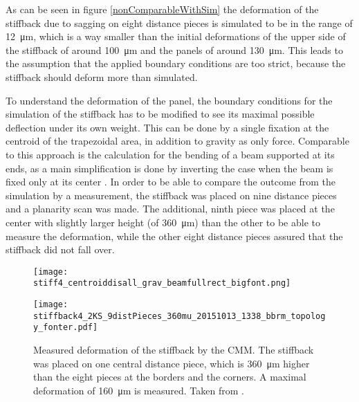 \documentclass[
a4paper,                                %
twoside,                                %
BCOR1.4cm,                      %
10pt,                           %
headings=normal,                %
headsepline,                    %
clearplainpage, %
final,                                  %
div=14,
parskip=full,
openright,
bibliography=toc
]{scrreprt}
\begin{document}
As can be seen in figure \ref{nonComparableWithSim} the deformation of the stiffback due to sagging on eight distance pieces is simulated to be in the range of \SI{12}{\micro\m}, which is a way smaller than the initial deformations of the upper side of the stiffback of around \SI{100}{\micro\m} and the panels of around \SI{130}{\micro\m}. This leads to the assumption that the applied boundary conditions are too strict, because the stiffback should deform more than simulated.

To understand the deformation of the panel, the boundary conditions for the simulation of the stiffback has to be modified to see its maximal possible deflection under its own weight. This can be done by a single fixation at the centroid of the trapezoidal area, in addition to gravity as only force. Comparable to this approach is the calculation for the bending of a beam supported at its ends, as a main simplification is done by inverting the case when the beam is fixed only at its center \cite{ansysBook}. In order to be able to compare the outcome from the simulation by a measurement, the stiffback was placed on nine distance pieces and a planarity scan was made. The additional, ninth piece was placed at the center with slightly larger height (of \SI{360}{\micro\m}) than the other to be able to measure the deformation, while the other eight distance pieces assured that the stiffback did not fall over.

\captionsetup[figure]{format=plain, labelsep=newline}
\begin{figure}[H]
	\begin{minipage}[b]{0.45\linewidth}
		\centering
		\texttt{[image: stiff4\_centroiddisall\_grav\_beamfullrect\_bigfont.png]}
		\caption{Simulated deformation of the stiffback due to gravitational sagging. Only boundary condition is the fixation of all degrees of freedom at the centroid (central red dot). A maximal deformation of \SI{117}{\micro\m} is simulated.}
		\label{stiffDefSim}
		\vspace{4mm}
	\end{minipage}
	\hspace{0.5cm}
	\begin{minipage}[b]{0.45\linewidth}
		\centering
		\texttt{[image: stiffback4\_2KS\_9distPieces\_360mu\_20151013\_1338\_bbrm\_topology\_fonter.pdf]}
		\caption{Measured deformation of the stiffback by the CMM. The stiffback was placed on one central distance piece, which is \SI{360}{\micro\m} higher than the eight pieces at the borders and the corners. A maximal deformation of \SI{160}{\micro\m} is measured. Taken from \cite{ralphMthesis}.}
		\label{stiffDefMeas}
	\end{minipage}
\end{figure}
\captionsetup[figure]{format=hang, labelsep=colon}
\end{document}

